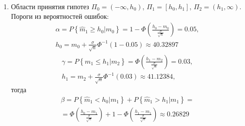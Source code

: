 \documentclass[a4paper,12pt]{article}
\newcommand{\probability}[1]{P \left\{ #1 \right\}}
\begin{document}
\begin{enumerate}
        \item Области принятия гипотез $\Pi_0 = (- \infty, h_0 )$, $\Pi_1 = [h_0, h_1]$, $\Pi_2 = (h_1, \infty )$. Пороги из вероятностей ошибок:
              \begin{gather*}
                  \alpha = \probability{\widehat{m}_1 \ge h_0 | m_0} = 1 - \Phi \left( \frac{h_0 - m_0}{\frac{\sigma}{\sqrt{n}}} \right) = 0.05, \\
                  h_0 = m_0 + \frac{\sigma}{\sqrt{n}} \Phi^{-1} (1 - 0.05) \approx 40.32897
              \end{gather*}
              \begin{gather*}
                  \gamma = \probability{\widehat{m}_1 \le h_1 | m_2} = \Phi \left( \frac{h_1 - m_2}{\frac{\sigma}{\sqrt{n}}} \right) = 0.03, \\
                  h_1 = m_2 + \frac{\sigma}{\sqrt{n}} \Phi^{-1} (0.03) \approx 41.12384 ,
              \end{gather*}
              тогда
              \begin{multline*}
                  \beta
                  = \probability{\widehat{m}_1 < h_0 | m_1} + \probability{\widehat{m}_1 > h_1 | m_1} = \\
                  = \Phi \left( \frac{h_0 - m_1}{\frac{\sigma}{\sqrt{n}}} \right) + 1 - \Phi \left( \frac{h_1 - m_1}{\frac{\sigma}{\sqrt{n}}} \right)
                  \approx 0.26829
              \end{multline*}


\end{enumerate}
\end{document}
